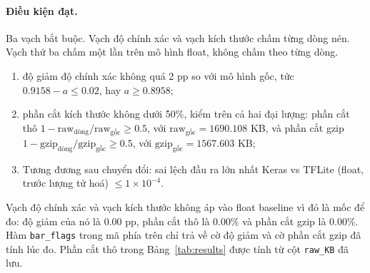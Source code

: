 \documentclass[13pt,a4paper]{article}
\begin{document}
\paragraph{Điều kiện đạt.}
Ba vạch bắt buộc.
Vạch độ chính xác và vạch kích thước chấm từng dòng nén.
Vạch thứ ba chấm một lần trên mô hình float, không chấm theo từng dòng.
\begin{enumerate}
  \item độ giảm độ chính xác không quá 2 pp so với mô hình gốc,
        tức \(0.9158 - a \le 0.02\), hay \(a \ge 0.8958\);
  \item phần cắt kích thước không dưới 50\%, kiểm trên cả hai đại lượng:
        phần cắt thô \(1 - \text{raw}_{\text{dòng}} / \text{raw}_{\text{gốc}} \ge 0.5\),
        với \(\text{raw}_{\text{gốc}} = 1690.108\) KB,
        và phần cắt gzip \(1 - \text{gzip}_{\text{dòng}} / \text{gzip}_{\text{gốc}} \ge 0.5\),
        với \(\text{gzip}_{\text{gốc}} = 1567.603\) KB;
  \item Tương đương sau chuyển đổi: sai lệch đầu ra lớn nhất Keras vs TFLite (float, trước lượng tử hoá) \(\le 1\times 10^{-4}\).
\end{enumerate}
Vạch độ chính xác và vạch kích thước không áp vào float baseline vì đó là mốc để đo:
độ giảm của nó là 0.00 pp, phần cắt thô là 0.00\% và phần cắt gzip là 0.00\%.
Hàm \texttt{bar\_flags} trong mã phía trên chỉ trả về cờ độ giảm và cờ phần cắt gzip đã tính lúc đo.
Phần cắt thô trong Bảng~\ref{tab:results} được tính từ cột \texttt{raw\_KB} đã lưu.
\end{document}
